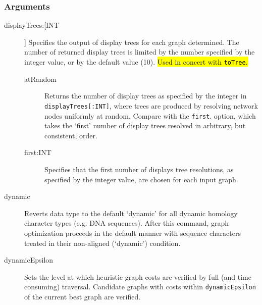	\subsubsection{Arguments}
	\begin{description}
			
			
		\item[displayTrees:[INT]] Specifies the output of display trees for each graph 
		determined. The number of returned display trees is limited by the number specified
		by the integer value, or by the default value (10). \hl{Used in concert with \texttt{toTree}.}
		
			\begin{description}
			\item[atRandom] Returns the number of display trees as specified by the integer in 
			\texttt{displayTrees[:INT]}, where trees are produced by resolving network nodes 
			uniformly at random. Compare with the \texttt{first}. option, which takes the `first' 
			number of display trees resolved in arbitrary, but consistent, order.

			\item[first:INT] Specifies that the first number of displays tree resolutions, as 
			specified by the integer value, are chosen for each input graph. 
			\end{description}
			
		\item[dynamic] Reverts data type to the default `dynamic' for all dynamic homology 
		\citep{Wheeler2001} character types (e.g. DNA sequences). After this command, 
		graph optimization proceeds in the default manner with sequence characters treated 
		in their non-aligned (`dynamic') condition.
			
		\item[dynamicEpsilon] Sets the level at which heuristic graph costs are verified by full 
		(and time consuming) traversal. Candidate graphs with costs within \texttt{dynamicEpsilon}
		 of the current best graph are verified.
			

\end{description}
